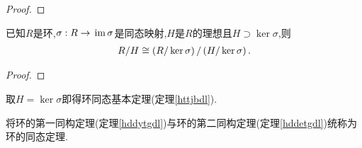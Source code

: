 \begin{proof}
    \stars
\end{proof}
\begin{theorem}[环的第二同构定理]\label{hddetgdl}
    已知$R$是环,$\sigma:R\to\,\mathrm{im}\,\sigma$是同态映射,$H$是$R$的理想且$H\supset\ker\sigma$,则\begin{align*}
        R/H\cong\left(R/\ker\sigma\right)/\left(H/\ker\sigma\right).
    \end{align*}
\end{theorem}
\begin{proof}
    \stars
\end{proof}
\begin{remark}
    取$H=\ker\sigma$即得环同态基本定理(定理\ref{httjbdl}).
\end{remark}
将环的第一同构定理(定理\ref{hddytgdl})与环的第二同构定理(定理\ref{hddetgdl})统称为环的同态定理.